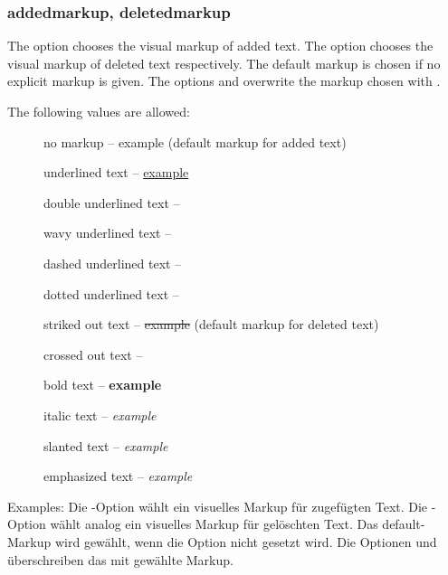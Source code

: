 \subsubsection{addedmarkup, deletedmarkup}
\ifENGLISH
The  option chooses the visual markup of added text.
The  option chooses the visual markup of deleted text respectively.
The default markup is chosen if no explicit markup is given.
The options  and  overwrite the markup chosen with .

The following values are allowed:
\begin{description}
	\item [] no markup -- example (default markup for added text)
	\item [] underlined text -- \uline{example}
	\item [] double underlined text -- 
	\item [] wavy underlined text -- 
	\item [] dashed underlined text -- 
	\item [] dotted underlined text -- 
	\item [] striked out text -- \sout{example} (default markup for deleted text)
	\item [] crossed out text -- 
	\item [] bold text -- \textbf{example}
	\item [] italic text -- \textit{example}
	\item [] slanted text -- \textsl{example}
	\item [] emphasized text -- \emph{example}
\end{description}

Examples:
\fi
\ifGERMAN
	Die -Option wählt ein visuelles Markup für zugefügten Text.
	Die -Option wählt analog ein visuelles Markup für gelöschten Text.
	Das default-Markup wird gewählt, wenn die Option nicht gesetzt wird.
	Die Optionen  und  überschreiben das mit  gewählte Markup.

